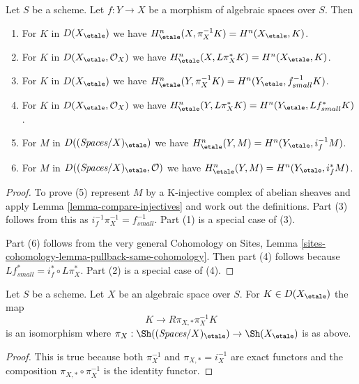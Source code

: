\begin{lemma}
\label{lemma-compare-cohommology}
Let $S$ be a scheme.
Let $f : Y \to X$ be a morphism of algebraic spaces over $S$. Then
\begin{enumerate}
\item For $K$ in $D(X_\etale)$ we have
$H^n_\etale(X, \pi_X^{-1}K) = H^n(X_\etale, K)$.
\item For $K$ in $D(X_\etale, \mathcal{O}_X)$ we have
$H^n_\etale(X, L\pi_X^*K) = H^n(X_\etale, K)$.
\item For $K$ in $D(X_\etale)$ we have
$H^n_\etale(Y, \pi_X^{-1}K) = H^n(Y_\etale, f_{small}^{-1}K)$.
\item For $K$ in $D(X_\etale, \mathcal{O}_X)$ we have
$H^n_\etale(Y, L\pi_X^*K) = H^n(Y_\etale, Lf_{small}^*K)$.
\item For $M$ in $D((\textit{Spaces}/X)_\etale)$ we have
$H^n_\etale(Y, M) = H^n(Y_\etale, i_f^{-1}M)$.
\item For $M$ in $D((\textit{Spaces}/X)_\etale, \mathcal{O})$ we have
$H^n_\etale(Y, M) = H^n(Y_\etale, i_f^*M)$.
\end{enumerate}
\end{lemma}

\begin{proof}
To prove (5) represent $M$ by a K-injective complex of abelian sheaves
and apply Lemma \ref{lemma-compare-injectives}
and work out the definitions. Part (3) follows from
this as $i_f^{-1}\pi_X^{-1} = f_{small}^{-1}$. Part (1) is a special
case of (3).

\medskip\noindent
Part (6) follows from the very general Cohomology on Sites, Lemma
\ref{sites-cohomology-lemma-pullback-same-cohomology}. Then part
(4) follows because $Lf_{small}^* = i_f^* \circ L\pi_X^*$.
Part (2) is a special case of (4).
\end{proof}

\begin{lemma}
\label{lemma-cohomological-descent-etale}
Let $S$ be a scheme. Let $X$ be an algebraic space over $S$.
For $K \in D(X_\etale)$ the map
$$
K \longrightarrow R\pi_{X, *}\pi_X^{-1}K
$$
is an isomorphism where
$\pi_X : \Sh((\textit{Spaces}/X)_\etale) \to \Sh(X_\etale)$ is as above.
\end{lemma}

\begin{proof}
This is true because both $\pi_X^{-1}$ and $\pi_{X, *} = i_X^{-1}$
are exact functors and the composition $\pi_{X, *} \circ \pi_X^{-1}$
is the identity functor.
\end{proof}










